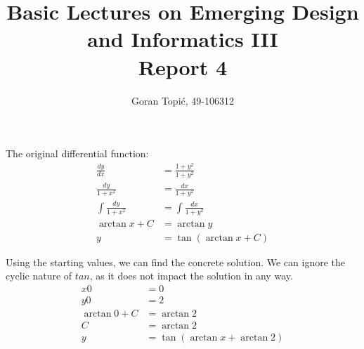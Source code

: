 \documentclass{article}
\begin{document}
\title{Basic Lectures on Emerging Design and Informatics III\\
Report 4}

\author{Goran Topi\'{c}, 49-106312}
\maketitle

The original differential function:
\begin{align}
  \frac{dy}{dx} &= \frac{1 + y^2}{1 + y^2} \\
  \frac{dy}{1 + x^2} &= \frac{dx}{1 + y^2} \\
  \int\frac{dy}{1 + x^2} &= \int\frac{dx}{1 + y^2} \\
  \arctan x + C &= \arctan y \\
  y &= \tan(\arctan x + C)
\end{align}

Using the starting values, we can find the concrete solution. We can ignore the cyclic nature of $tan$, as it does not impact the solution in any way.
\begin{align}
  x0 &= 0 \\
  y0 &= 2 \\
  \arctan 0 + C &= \arctan 2 \\
  C &= \arctan 2 \\
  y &= \tan(\arctan x + \arctan 2)
\end{align}
\end{document}
